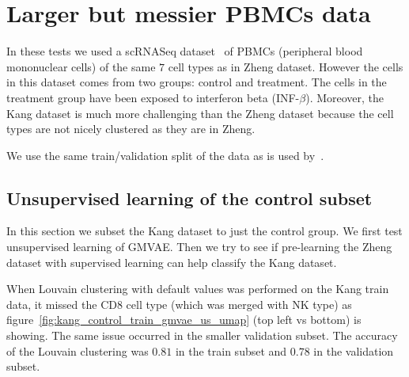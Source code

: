 \documentclass[11pt, a4paper]{report}
\theoremstyle{plain}
\theoremstyle{definition}
\theoremstyle{remark}
\begin{document}


\chapter{Larger but messier PBMCs data}
In these tests we used a scRNASeq dataset~\cite{kang2018multiplexed} of PBMCs
(peripheral blood mononuclear cells) of the same $7$ cell types as in Zheng
dataset.
However the cells in this dataset comes from two groups:
control and treatment. The cells in the treatment group have been exposed to
interferon beta (INF-$\beta$).
Moreover,
the Kang dataset is much more challenging than the Zheng dataset because the
cell types are not nicely clustered as they are in Zheng.

We use the same train/validation split of the data as is used
by~\cite{lotfollahi2019scgen}.

\section{Unsupervised learning of the control subset}

In this section we subset the Kang dataset to just the control group. We first
test unsupervised learning of GMVAE. Then we try to see if pre-learning the
Zheng dataset with supervised learning can help classify the Kang dataset.

When Louvain clustering with default values was performed on the Kang train data,
it missed the CD8 cell type (which was merged with NK type) as
figure~\ref{fig:kang_control_train_gmvae_us_umap} (top left vs bottom) is showing.
The same issue occurred in
the smaller validation subset.
The accuracy of the Louvain clustering was $0.81$ in the train subset and
$0.78$ in the validation subset.
\end{document}
